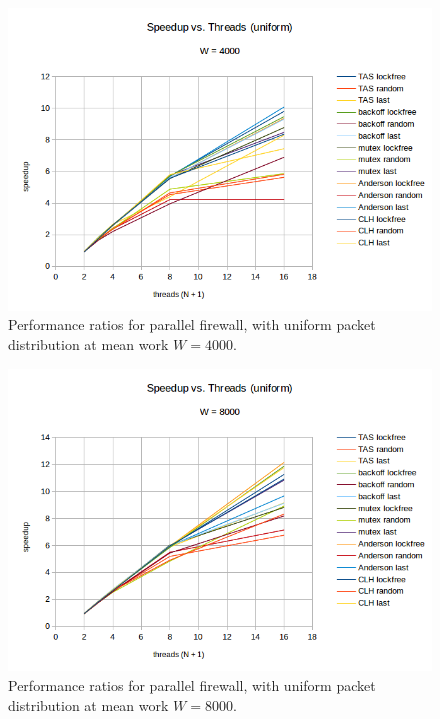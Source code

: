 \documentclass{article}
\begin{document}
\begin{figure}
\begin{center}
	\includegraphics[scale=.8]{packet_2_4000.png}
	\caption{Performance ratios for parallel firewall, with uniform packet distribution at mean work $W = 4000$.}
	\label{packet_2_4000}
\end{center}
\end{figure}

\begin{figure}
\begin{center}
	\includegraphics[scale=.8]{packet_2_8000.png}
	\caption{Performance ratios for parallel firewall, with uniform packet distribution at mean work $W = 8000$.}
	\label{packet_2_8000}
\end{center}
\end{figure}
\end{document}
